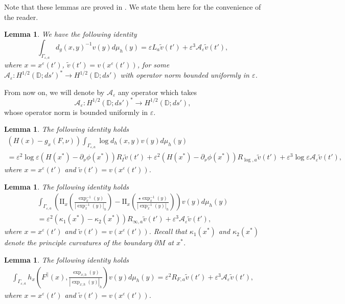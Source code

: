 \documentclass[12pt,a4paper]{amsart}
\numberwithin{equation}{section}
\theoremstyle{plain}
\newtheorem{lemma}[theorem]{Lemma}
\theoremstyle{definition}
\newcommand{\D}{\mathbb{D}}
\newcommand{\A}{\mathcal A}
\begin{document}
 Note that these lemmas are proved in \cite{NursultanovTzouTzou,NursultanovTradTzou}. We state them here for the convenience of the reader.
\begin{lemma}\label{l1}
		We have the following identity
		\begin{equation*}
			\int_{\Gamma_{\varepsilon,a}} d_g(x,y)^{-1}v(y)d\mu_h(y) = \varepsilon L_a\tilde v (t') + \varepsilon^3 \mathcal{A}_\varepsilon\tilde v(t'),
		\end{equation*}
		where $x=x^{\varepsilon}(t')$, $\tilde v(t') = v(x^{\varepsilon}(t'))$, for some $\A_\varepsilon : H^{1/2}(\D; ds')^* \to H^{1/2}(\D; ds')$ with operator norm bounded uniformly in $\varepsilon$.
\end{lemma}

From now on, we will denote by $\A_\varepsilon$ any operator which takes 
$$\A_\varepsilon: H^{1/2}(\D ;ds')^* \to H^{1/2}(\D; ds'),$$ 
whose operator norm is bounded uniformly in $\varepsilon$. 
	\begin{lemma}\label{l2}
		The following identity holds
		\begin{multline*}
			(H(x)-g_x(F,\nu))\int_{\Gamma_{\varepsilon,a}} \log d_h(x,y) v(y)d\mu_h(y)\\
			= \varepsilon^2\log\varepsilon(H(x^*)-\partial_{\nu}\phi(x^*)) R_I\tilde v(t') + \varepsilon^2 (H(x^*)-\partial_{\nu}\phi(x^*))R_{\log,a} \tilde v(t') + \varepsilon^3\log\varepsilon \mathcal{A}_\varepsilon \tilde v(t'),
		\end{multline*}
		where $x=x^{\varepsilon}(t')$ and $\tilde v(t') = v(x^{\varepsilon}(t'))$.
	\end{lemma}
\begin{lemma}
		The following identity holds
		\begin{multline*}
			\int_{\Gamma_{\varepsilon,a}}\left(\mathrm{II}_x\left(\frac{\exp_x^{-1}(y)}{|\exp_x^{-1}(y)|_h}\right)-\mathrm{II}_x\left(\frac{\star\exp_x^{-1}(y)}{|\exp_x^{-1}(y)|_h}\right)\right)v(y)d\mu_h(y)\\
			=\varepsilon^2(\kappa_1(x^*)-\kappa_2(x^*)) R_{\infty,a} \tilde v(t') + \varepsilon^3 \A_\varepsilon \tilde v(t'),
		\end{multline*}
		where $x=x^{\varepsilon}(t')$ and $\tilde v(t') = v(x^{\varepsilon}(t'))$. Recall that $\kappa_1(x^*)$ and $\kappa_2(x^*)$ denote the principle curvatures of the boundary $\partial M$ at $x^*$. 
	\end{lemma}
	
	
\begin{lemma}\label{l4}
		The following identity holds
		\begin{align*}
			\int_{\Gamma_{\varepsilon,a}} h_x\left(F^{\parallel}(x), \frac{\exp_{x; h}(y)}{|\exp_{x; h}(y)|_h}\right) v(y)d\mu_h(y) = \varepsilon ^2 R_{F,a}\tilde v(t') + \varepsilon^3\mathcal{A}_\varepsilon\tilde v(t'),
		\end{align*}
		where $x=x^{\varepsilon}(t')$ and $\tilde v(t') = v(x^{\varepsilon}(t'))$.
\end{lemma}
	
\end{document}
